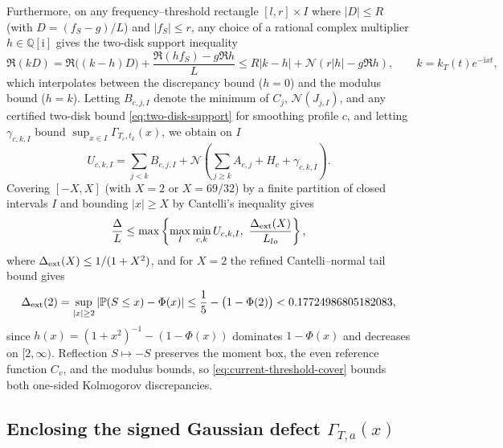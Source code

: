 \documentclass[11pt]{article}
\numberwithin{equation}{section}
\theoremstyle{remark}
\newcommand{\Prob}{\mathbb P}
\newcommand{\ii}{\mathrm i}
\begin{document}
Furthermore, on any frequency--threshold rectangle $[l,r]\times I$ where
$|D|\le R$ (with $D=(f_S-g)/L$) and $|f_S|\le r$, any choice of a rational
complex multiplier $h\in\mathbb Q[\ii]$ gives the two-disk support inequality
\begin{equation}\label{eq:two-disk-support}
 \Re(kD)
 =\Re\bigl((k-h)D\bigr)+\frac{\Re(hf_S)-g\Re h}{L}
 \le R|k-h|+\mathcal N(r|h|-g\Re h),
 \qquad k=k_T(t)e^{-\ii xt},
\end{equation}
which interpolates between the discrepancy bound ($h=0$) and the modulus
bound ($h=k$). Letting $B_{c,j,I}$ denote the minimum of $C_j$,
$\mathcal N(J_{j,I})$, and any certified two-disk bound \eqref{eq:two-disk-support}
for smoothing profile $c$, and letting $\gamma_{c,k,I}$ bound
$\sup_{x\in I}\Gamma_{T_c,t_k}(x)$, we obtain on $I$
\[
 U_{c,k,I}=\sum_{j<k}B_{c,j,I}
      +\mathcal N\left(\sum_{j\ge k}A_{c,j}+H_c+\gamma_{c,k,I}\right).
\]
Covering $[-X,X]$ (with $X=2$ or $X=69/32$) by a finite partition of closed
intervals $I$ and bounding $|x|\ge X$ by Cantelli's inequality gives
\begin{equation}\label{eq:current-threshold-cover}
 \frac{\Delta}{L}\le
 \max\left\{\max_I\min_{c,k}U_{c,k,I},\ \frac{\Delta_{\rm ext}(X)}{L_{lo}}\right\},
\end{equation}
where $\Delta_{\rm ext}(X)\le1/(1+X^2)$, and for $X=2$ the refined
Cantelli--normal tail bound gives
\begin{equation}\label{eq:normal-tail-cantelli}
 \Delta_{\rm ext}(2)=\sup_{|x|\ge2}|\Prob(S\le x)-\Phi(x)|
 \le \frac15-\bigl(1-\Phi(2)\bigr)<0.17724986805182083,
\end{equation}
since $h(x)=(1+x^2)^{-1}-(1-\Phi(x))$ dominates $1-\Phi(x)$ and decreases
on $[2,\infty)$. Reflection $S\mapsto-S$ preserves the moment box, the even
reference function $C_v$, and the modulus bounds, so \eqref{eq:current-threshold-cover}
bounds both one-sided Kolmogorov discrepancies.

\subsection{Enclosing the signed Gaussian defect $\Gamma_{T,a}(x)$}
\end{document}
